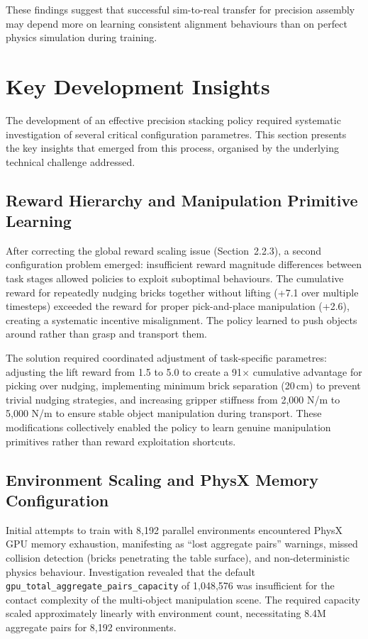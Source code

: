 \documentclass[12pt,a4paper,oneside]{report}
\begin{document}
These findings suggest that successful sim-to-real transfer for precision assembly may depend more on learning consistent alignment behaviours than on perfect physics simulation during training.

\section{Key Development Insights}

The development of an effective precision stacking policy required systematic investigation of several critical configuration parametres. This section presents the key insights that emerged from this process, organised by the underlying technical challenge addressed.

\subsection{Reward Hierarchy and Manipulation Primitive Learning}

After correcting the global reward scaling issue (Section~2.2.3), a second configuration problem emerged: insufficient reward magnitude differences between task stages allowed policies to exploit suboptimal behaviours. The cumulative reward for repeatedly nudging bricks together without lifting (+7.1 over multiple timesteps) exceeded the reward for proper pick-and-place manipulation (+2.6), creating a systematic incentive misalignment. The policy learned to push objects around rather than grasp and transport them.

The solution required coordinated adjustment of task-specific parametres: adjusting the lift reward from 1.5 to 5.0 to create a 91$\times$ cumulative advantage for picking over nudging, implementing minimum brick separation (20\,cm) to prevent trivial nudging strategies, and increasing gripper stiffness from 2,000 N/m to 5,000 N/m to ensure stable object manipulation during transport. These modifications collectively enabled the policy to learn genuine manipulation primitives rather than reward exploitation shortcuts.

\subsection{Environment Scaling and PhysX Memory Configuration}

Initial attempts to train with 8,192 parallel environments encountered PhysX GPU memory exhaustion, manifesting as ``lost aggregate pairs'' warnings, missed collision detection (bricks penetrating the table surface), and non-deterministic physics behaviour. Investigation revealed that the default \texttt{gpu\_total\_aggregate\_pairs\_capacity} of 1,048,576 was insufficient for the contact complexity of the multi-object manipulation scene. The required capacity scaled approximately linearly with environment count, necessitating 8.4M aggregate pairs for 8,192 environments.
\end{document}
